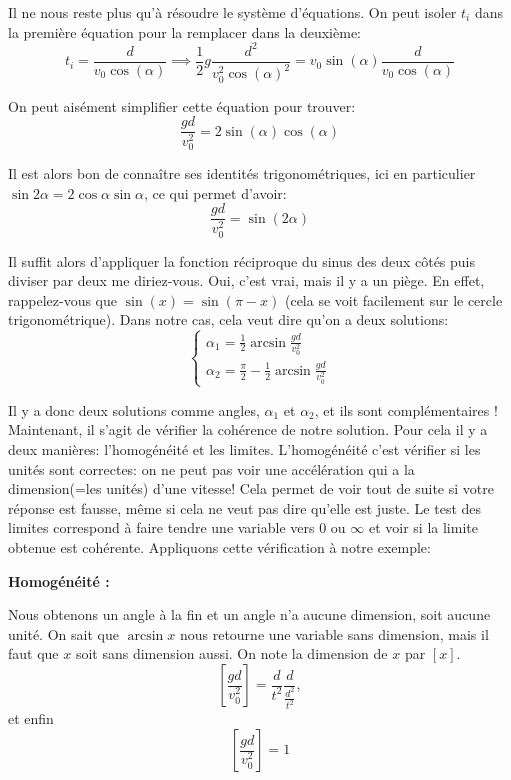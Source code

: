 \documentclass{article}
\begin{document}
Il ne nous reste plus qu'à résoudre le système d'équations. On peut isoler $t_i$ dans la première équation pour la remplacer dans la deuxième: 
\[ t_i = \frac{d}{v_0 \cos{(\alpha)}} \implies \frac{1}{2}g  \frac{d^2}{v_{0}^2 \cos{(\alpha)}^2} = v_0 \sin{(\alpha)} \frac{d}{v_0 \cos{(\alpha)}}\]

On peut aisément simplifier cette équation pour trouver: 
\[ \frac{gd}{v_{0}^2 } = 2 \sin{(\alpha)} \cos{(\alpha)} \]

Il est alors bon de connaître ses identités trigonométriques, ici en particulier $\sin{2 \alpha} = 2 \cos{\alpha} \sin{\alpha}$, ce qui permet d'avoir:
\[ \frac{gd}{v_{0}^2 }= \sin{(2\alpha)} \]

Il suffit alors d'appliquer la fonction réciproque du sinus des deux côtés puis diviser par deux me diriez-vous. Oui, c'est vrai, mais il y a un piège. En effet, rappelez-vous que $\sin{(x)} = \sin{(\pi - x)}$ (cela se voit facilement sur le cercle trigonométrique). Dans notre cas, cela veut dire qu'on a deux solutions: 
\begin{equation*}
   \begin{cases}
    \alpha_1 = \frac{1}{2}\arcsin{\frac{gd}{v_{0}^2}} \\
    \alpha_2 = \frac{\pi}{2} - \frac{1}{2}\arcsin{\frac{gd}{v_{0}^2}}
   \end{cases} 
\end{equation*}

Il y a donc deux solutions comme angles, $\alpha_1$ et $\alpha_2$, et ils sont complémentaires !
Maintenant, il s'agit de vérifier la cohérence de notre solution. Pour cela il y a deux manières: l'homogénéité et les limites. L'homogénéité c'est vérifier si les unités sont correctes: on ne peut pas voir une accélération qui a la dimension(=les unités) d'une vitesse! Cela permet de voir tout de suite si votre réponse est fausse, même si cela ne veut pas dire qu'elle est juste. Le test des limites correspond à faire tendre une variable vers 0 ou $\infty$ et voir si la limite obtenue est cohérente. Appliquons cette vérification à notre exemple:\\\hfill

    \noindent \textbf{Homogénéité :}
    
    Nous obtenons un angle à la fin et un angle n'a aucune dimension, soit aucune unité. On sait que $\arcsin{x}$ nous retourne une variable sans dimension, mais il faut que $x$ soit sans dimension aussi. On note la dimension de $x$ par $[x]$.
    \[ \left[\frac{gd}{v_{0}^2}\right]= \frac{d}{t^2} \dfrac{d}{\frac{d^2}{t^2}},\]
    et enfin
    \[ \boxed{\left[\frac{gd}{v_{0}^2}\right]=1}\]
    
\end{document}
